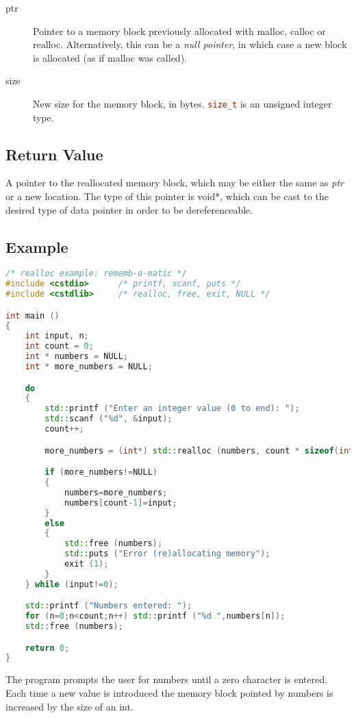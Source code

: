 \begin{description}
\item[ptr] Pointer to a memory block previously allocated with malloc, calloc or realloc. Alternatively, this can be a \textit{null pointer}, in which case a new block is allocated (as if malloc was called).
\item[size] New size for the memory block, in bytes. \lstinline[language=c++]|size_t| is an unsigned integer type.
\end{description}

\subsection{Return Value}
A pointer to the reallocated memory block, which may be either the same as \textit{ptr} or a new location. The type of this pointer is void*, which can be cast to the desired type of data pointer in order to be dereferenceable.


\subsection{Example}
\begin{lstlisting}[language=c++]
/* realloc example: rememb-o-matic */
#include <cstdio>      /* printf, scanf, puts */
#include <cstdlib>     /* realloc, free, exit, NULL */

int main ()
{
	int input, n;
	int count = 0;
	int * numbers = NULL;
	int * more_numbers = NULL;

	do
	{
		std::printf ("Enter an integer value (0 to end): ");
		std::scanf ("%d", &input);
		count++;

		more_numbers = (int*) std::realloc (numbers, count * sizeof(int));

		if (more_numbers!=NULL)
		{
			numbers=more_numbers;
			numbers[count-1]=input;
		}
		else
		{
			std::free (numbers);
			std::puts ("Error (re)allocating memory");
			exit (1);
		}
	} while (input!=0);

	std::printf ("Numbers entered: ");
	for (n=0;n<count;n++) std::printf ("%d ",numbers[n]);
	std::free (numbers);

	return 0;
}
\end{lstlisting}

The program prompts the user for numbers until a zero character is entered. Each time a new value is introduced the memory block pointed by numbers is increased by the size of an int.

